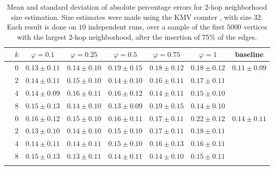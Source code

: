 \begin{table*}[ht]
    \centering
    \caption{Mean and standard deviation of absolute percentage errors for $2$-hop neighborhood size estimation. Size estimates were made using the KMV counter \cite{trevisan/646978.711822}, with size $32$.
    Each result is done on $10$ independent runs, over a sample of the first $5000$ vertices with the largest $2$-hop neighborhood, after the insertion of $75\%$ of the edges.
    }
    \begin{tabular}{lc|ccccc|c}
    \toprule
        & $k$ & $\varphi = 0.1$ & $\varphi = 0.25$ & $\varphi = 0.5$ & $\varphi = 0.75$ & $\varphi = 1$ & baseline\\
    \midrule

            \parbox[t]{2mm}{}

        & $0$ & $0.13 \pm 0.11$ & $0.14 \pm 0.10$ & $0.19 \pm 0.15$ & $0.18 \pm 0.12$ & $0.18 \pm 0.12$ &  \\
        & $2$ & $0.14 \pm 0.11$ & $0.15 \pm 0.10$ & $0.14 \pm 0.10$ & $0.16 \pm 0.11$ & $0.17 \pm 0.11$ & \\
        & $4$ & $0.14 \pm 0.09$ & $0.16 \pm 0.11$ & $0.16 \pm 0.12$ & $0.14 \pm 0.11$ & $0.15 \pm 0.10$ & \\
        & $8$ & $0.15 \pm 0.13$ & $0.14 \pm 0.10$ & $0.13 \pm 0.09$ & $0.19 \pm 0.15$ & $0.14 \pm 0.10$ & \\

        \midrule[.66pt]

        \parbox[t]{2mm}{}

        & $0$ & $0.16 \pm 0.12$ & $0.15 \pm 0.10$ & $0.16 \pm 0.11$ & $0.17 \pm 0.11$ & $0.22 \pm 0.12$ &  \\
        & $2$ & $0.13 \pm 0.10$ & $0.14 \pm 0.10$ & $0.15 \pm 0.10$ & $0.17 \pm 0.11$ & $0.18 \pm 0.11$ & \\
        & $4$ & $0.14 \pm 0.11$ & $0.14 \pm 0.11$ & $0.15 \pm 0.10$ & $0.16 \pm 0.13$ & $0.16 \pm 0.11$ & \\
        & $8$ & $0.15 \pm 0.13$ & $0.13 \pm 0.11$ & $0.14 \pm 0.11$ & $0.14 \pm 0.10$ & $0.15 \pm 0.11$ & \\

        \midrule[.66pt]

        \parbox[t]{2mm}{}


\end{tabular}
\end{table*}
